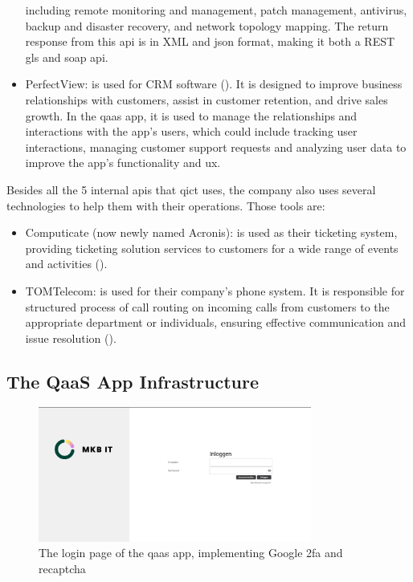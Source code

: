 \begin{multicols}{2}
\begin{itemize}
                  including remote monitoring and management, patch management, antivirus, backup and disaster
                  recovery, and network topology mapping. The return response from this \acrshort{api} is in \gls{XML}
                  and \acrshort{json} format, making it both a \gls{REST gls} and \acrshort{soap} \acrshort{api}.
            \item PerfectView: is used for \gls{CRM} software (\textit{\cite{perfectView}}). It is designed to
                  improve business relationships with customers, assist in customer retention, and drive sales growth.
                  In the \acrshort{qaas} app, it is used to manage the relationships and interactions with the app's users,
                  which could include tracking user interactions, managing customer support requests and analyzing user
                  data to improve the app's functionality and \acrshort{ux}.
      \end{itemize}

      Besides all the 5 internal \acrshort{api}s that \acrshort{qict} uses, the company also uses several technologies to help them with their
      operations. Those tools are:

      \begin{itemize}
            \item Computicate (now newly named Acronis): is used as their ticketing system, providing ticketing solution services to customers for
                  a wide range of events and activities (\textit{\cite{computicate}}).
            \item TOMTelecom: is used for their company's phone system. It is responsible for structured process of call routing on incoming calls
                  from customers to the appropriate department or individuals, ensuring effective communication and issue resolution
                  (\textit{\cite{tomTelecom}}).
      \end{itemize}

      \subsection{The QaaS App Infrastructure}
\end{multicols}

\begin{figure}[htbp]
      \centering
      \includegraphics[width=0.8\textwidth]{Figures/Qaas App/Landing Page.png}
      \caption{The login page of the \acrshort{qaas} app, implementing Google \acrshort{2fa} and re\acrshort{captcha}}
\end{figure}

